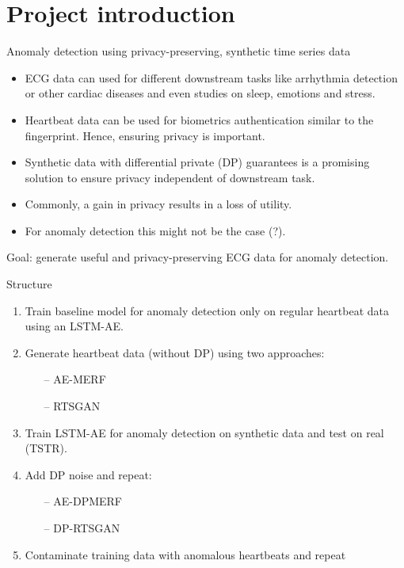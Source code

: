 \section{Project introduction}
\begin{frame}{Anomaly detection using privacy-preserving, synthetic time series data}

    \begin{itemize}
        \item ECG data can used for different downstream tasks like arrhythmia detection or other cardiac diseases and even studies on sleep, emotions and stress.
        \item Heartbeat data can be used for biometrics authentication similar to the fingerprint. Hence, ensuring privacy is important.
        \item Synthetic data with differential private (DP) guarantees is a promising solution to ensure privacy independent of downstream task.
        \item Commonly, a gain in privacy results in a loss of utility.
        \item For anomaly detection this might not be the case (?).
    \end{itemize}
    Goal: generate useful and privacy-preserving ECG data for anomaly detection.
\end{frame}

\begin{frame}{Structure}
    \begin{enumerate}
        \item Train baseline model for anomaly detection only on regular heartbeat data using an LSTM-AE.
        \item Generate heartbeat data (without DP) using two approaches:
        \begin{itemize}
            \item[--] AE-MERF
            \item[--] RTSGAN
        \end{itemize}
        \item Train LSTM-AE for anomaly detection on synthetic data and test on real (TSTR).
        \item Add DP noise and repeat:
        \begin{itemize}
            \item[--] AE-DPMERF
            \item[--] DP-RTSGAN
        \end{itemize}
        \item Contaminate training data with anomalous heartbeats and repeat
    \end{enumerate}
\end{frame}


